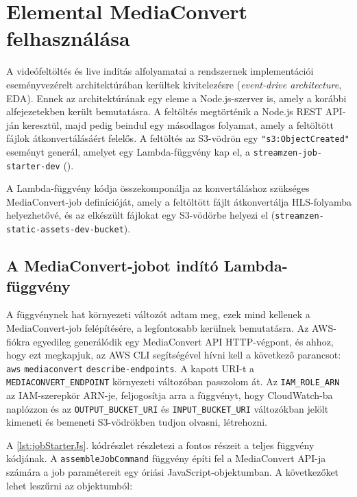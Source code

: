 \section{Elemental MediaConvert felhasználása}

A videófeltöltés és live indítás alfolyamatai a rendszernek implementációi eseményvezérelt architektúrában kerültek kivitelezésre (\emph{event-drive architecture}, EDA\cite{eda}). Ennek az architektúrának egy eleme a Node.js-szerver is, amely a korábbi alfejezetekben került bemutatásra. A feltöltés megtörténik a Node.js REST API-ján keresztül, majd pedig beindul egy másodlagos folyamat, amely a feltöltött fájlok átkonvertálásáért felelős. A feltöltés az S3-vödrön egy \verb|"s3:ObjectCreated"| eseményt generál, amelyet egy Lambda-függvény kap el, a \verb|streamzen-job-starter-dev| ().

A Lambda-függvény kódja összekomponálja az konvertáláshoz szükséges MediaConvert-job definícióját, amely a feltöltött fájlt átkonvertálja HLS-folyamba helyezhetővé, és az elkészült fájlokat egy S3-vödörbe helyezi el (\verb|streamzen-static-assets-dev-bucket|).

\subsection{A MediaConvert-jobot indító Lambda-függvény}

A függvénynek hat környezeti változót adtam meg, ezek mind kellenek a MediaConvert-job felépítésére, a legfontosabb kerülnek bemutatásra. Az AWS-fiókra egyedileg generálódik egy MediaConvert API HTTP-végpont, és ahhoz, hogy ezt megkapjuk, az AWS CLI segítségével hívni kell a következő parancsot: \verb|aws| \verb|mediaconvert| \verb|describe-endpoints|. A kapott URI-t a \verb|MEDIACONVERT_ENDPOINT| környezeti változóban passzolom át. Az \verb|IAM_ROLE_ARN| az IAM-szerepkör ARN-je, feljogosítja arra a függvényt, hogy CloudWatch-ba naplózzon és az \verb|OUTPUT_BUCKET_URI| és \verb|INPUT_BUCKET_URI| változókban jelölt kimeneti és bemeneti S3-vödrökben tudjon olvasni, létrehozni.

A \ref{lst:jobStarterJs}. kódrészlet részletezi a fontos részeit a teljes függvény kódjának. A \verb|assembleJobCommand| függvény építi fel a MediaConvert API-ja számára a job paramétereit egy óriási JavaScript-objektumban. A következőket lehet leszűrni az objektumból:


